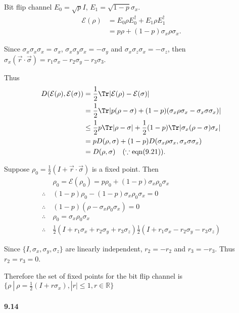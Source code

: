 Bit flip channel $E_0 = \sqrt{p} I$,  $E_1 = \sqrt{1-p}\sigma_x$.
\begin{align*}
	\mathcal{E}(\rho) &= E_0 \rho E_0^\dagger + E_1 \rho E_1^\dagger\\
		&= p \rho + (1-p) \sigma_x \rho \sigma_x.
\end{align*}

Since $\sigma_x \sigma_x \sigma_x = \sigma_x$, $\sigma_x \sigma_y \sigma_x = -\sigma_y$ and $\sigma_x \sigma_z \sigma_x = -\sigma_z$, then $\sigma_x (\vec{r} \cdot \vec{\sigma}) = r_1 \sigma_x - r_2 \sigma_y - r_3 \sigma_3$.

Thus
\begin{align*}
	D(\mathcal{E}(\rho), \mathcal{E}(\sigma)) &= \frac{1}{2} \Tr |\mathcal{E}(\rho) -  \mathcal{E}(\sigma)|\\
		&= \frac{1}{2} \Tr |p(\rho - \sigma) + (1-p) (\sigma_x \rho \sigma_x - \sigma_x \sigma \sigma_x) |\\
		&\leq \frac{1}{2}p \Tr |\rho - \sigma | + \frac{1}{2} (1-p) \Tr |\sigma_x (\rho - \sigma) \sigma_x|\\
		&= pD(\rho, \sigma) +  (1-p) D(\sigma_x \rho \sigma_x, \sigma_x \sigma \sigma_x)\\
		&= D(\rho, \sigma)~~~(\because \text{eqn}(9.21)).
\end{align*}


Suppose $\rho_0 = \frac{1}{2}(I + \vec{r}\cdot \vec{\sigma})$ is a fixed point. Then
\begin{align*}
	&\rho_0 = \mathcal{E}(\rho_0) =p \rho_0 + (1-p) \sigma_x \rho_0 \sigma_x\\
	\therefore~ &(1-p) \rho_0 - (1-p) \sigma_x \rho_0 \sigma_x = 0\\
	\therefore~ &(1-p) (\rho - \sigma_x \rho_0 \sigma_x) = 0\\
	\therefore~ &\rho_0 = \sigma_x \rho_0 \sigma_x\\
	\therefore~ &\frac{1}{2} (I + r_1 \sigma_x + r_2 \sigma_y + r_3 \sigma_z)  \frac{1}{2} (I + r_1 \sigma_x - r_2 \sigma_y - r_3 \sigma_z)
\end{align*}

Since $\{I, \sigma_x, \sigma_y, \sigma_z \}$ are linearly independent, $r_2 = -r_2$ and $r_3 = - r_3$. Thus $r_2 = r_3 = 0$.

Therefore the set of fixed points for the bit flip channel is $\{\rho~ |~ \rho = \frac{1}{2}(I + r \sigma_x), |r| \leq 1, r \in \mathds{R} \}$


\paragraph{9.14}

